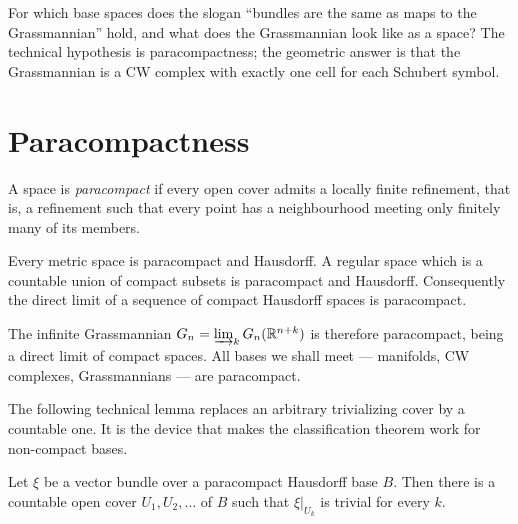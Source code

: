 \lecture

\begin{guiding}
For which base spaces does the slogan ``bundles are the same as maps to the
Grassmannian'' hold, and what does the Grassmannian look like as a space? The
technical hypothesis is paracompactness; the geometric answer is that the
Grassmannian is a CW complex with exactly one cell for each Schubert symbol.
\end{guiding}

\section{Paracompactness}

\begin{definition}
A space is \emph{paracompact} if every open cover admits a locally finite
refinement, that is, a refinement such that every point has a neighbourhood
meeting only finitely many of its members.
\end{definition}

\begin{theorem}[quoted]
Every metric space is paracompact and Hausdorff. A regular space which is a
countable union of compact subsets is paracompact and Hausdorff. Consequently
the direct limit of a sequence of compact Hausdorff spaces is paracompact.
\end{theorem}

\begin{remark}
The infinite Grassmannian $G_n=\varinjlim_k G_n(\mathbb{R}^{n+k})$ is therefore
paracompact, being a direct limit of compact spaces. All bases we shall meet ---
manifolds, CW complexes, Grassmannians --- are paracompact.
\end{remark}

The following technical lemma replaces an arbitrary trivializing cover by a
countable one. It is the device that makes the classification theorem work for
non-compact bases.

\begin{lemma}\label{lem:countable-cover}
Let $\xi$ be a vector bundle over a paracompact Hausdorff base $B$. Then there
is a countable open cover $U_1,U_2,\dots$ of $B$ such that $\xi|_{U_k}$ is
trivial for every $k$.
\end{lemma}

